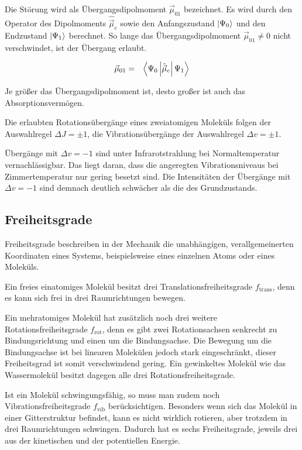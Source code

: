 \documentclass[12pt,a4paper]{scrartcl}
\numberwithin{equation}{section} %
\begin{document}
Die Störung wird als Übergangsdipolmoment $\vec\mu_{01}$ bezeichnet. Es wird durch den Operator des Dipolmoments $\hat {\vec \mu}_e$ sowie den Anfangszustand $\ket{\Psi_0}$ und den Endzustand $\ket{\Psi_1}$ berechnet. So lange das Übergangsdipolmoment $\vec\mu_{01}\neq0$ nicht verschwindet, ist der Übergang erlaubt.

\begin{eqnarray}
  \vec \mu_{01} &=& \expval{\Psi_0\left|\hat {\vec \mu}_e\right|\Psi_1}
\end{eqnarray}

\noindent
Je größer das Übergangsdipolmoment ist, desto großer ist auch das Absorptionsvermögen.

Die erlaubten Rotationsübergänge eines zweiatomigen Moleküls folgen der Auswahlregel $\Delta J = \pm 1$, die Vibrationsübergänge der Auswahlregel $\Delta v = \pm 1$.

Übergänge mit $\Delta v = -1$ sind unter Infrarotstrahlung bei Normaltemperatur vernachlässigbar. Das liegt daran, dass die angeregten Vibrationsniveaus bei Zimmertemperatur nur gering besetzt sind. Die Intensitäten der Übergänge mit $\Delta v = -1$ sind demnach deutlich schwächer als die des Grundzustands.

\hypertarget{freiheitsgrade}{%
\subsection{Freiheitsgrade}\label{freiheitsgrade}}

Freiheitsgrade beschreiben in der Mechanik die unabhängigen, verallgemeinerten Koordinaten eines Systems, beispielsweise eines einzelnen Atoms oder eines Moleküls.

Ein freies einatomiges Molekül besitzt drei Translationsfreiheitsgrade $f_\mathrm{trans}$, denn es kann sich frei in drei Raumrichtungen bewegen. \cite{Gerthsen}

Ein mehratomiges Molekül hat zusätzlich noch drei weitere Rotationsfreiheitsgrade $f_\mathrm{rot}$, denn es gibt zwei Rotationsachsen senkrecht zu Bindungsrichtung und einen um die Bindungsachse. Die Bewegung um die Bindungsachse ist bei linearen Molekülen jedoch stark eingeschränkt, dieser Freiheitsgrad ist somit verschwindend gering. \cite{Freiheitsgrad} Ein gewinkeltes Molekül wie das Wassermolekül besitzt dagegen alle drei Rotationsfreiheitsgrade. \cite{Gerthsen}

Ist ein Molekül schwingungsfähig, so muss man zudem noch Vibrationsfreiheitsgrade $f_\mathrm{vib}$ berücksichtigen. Besonders wenn sich das Molekül in einer Gitterstruktur befindet, kann es nicht wirklich rotieren, aber trotzdem in drei Raumrichtungen schwingen. Dadurch hat es sechs Freiheitsgrade, jeweils drei aus der kinetischen und der potentiellen Energie.
\end{document}
